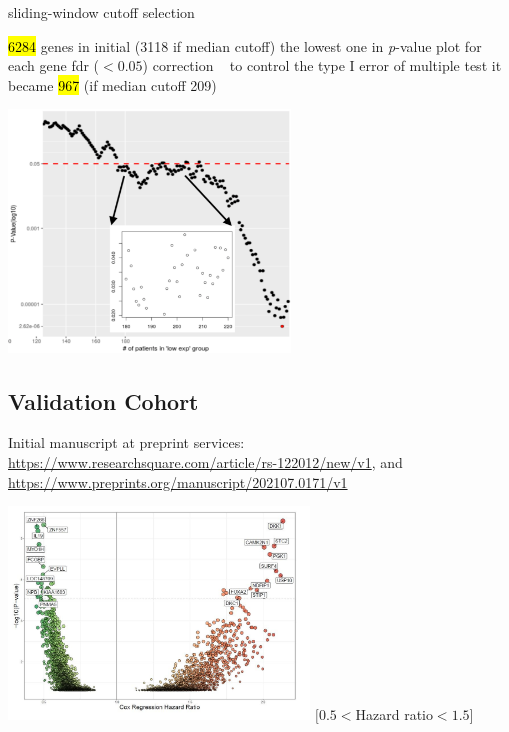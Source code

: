 \documentclass[
paper=landscape,
paper=160mm:90mm, %
fontsize=11pt, %
pagesize, %
parskip=half-, %
]{scrartcl} %
\theoremstyle{mythmstyle} %
\begin{document}
\begin{minipage}[c]{0.45\linewidth}

\begin{outline}

\1 sliding-window cutoff selection

    \2  \hl{6284} genes in initial (3118 if median cutoff)
    \2 the lowest one in \textit{p}-value plot for each gene
\2  \acrfull{fdr} ($ < 0.05$) correction {\tiny ~\autocite{Benjamini1995a}} to control the type I error of multiple test
\2 it became \hl{967} (if median cutoff 209)


\end{outline}
\end{minipage}
\begin{minipage}[c]{0.35\linewidth}
\includegraphics[width=7.5cm]{Rplot_pvaluePlot_NDFIP1.pdf}
\end{minipage}



\clearpage

\subsection{Validation Cohort}

Initial manuscript at preprint services: \url{https://www.researchsquare.com/article/rs-122012/new/v1}, and \url{https://www.preprints.org/manuscript/202107.0171/v1}

\includegraphics[width=8cm]{fcaf149553b93b72bd044c41.jpg} {\tiny $[0.5<$Hazard ratio$<1.5]$}
\end{document}

